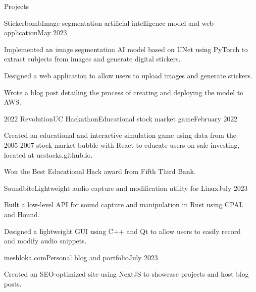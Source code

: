\documentclass{article}
\newlength{\tabin}
\newlength{\secsep}
\newenvironment{tabbedsection}[1]{
  \begin{list}{}{
      \setlength{\itemsep}{0pt}
      \setlength{\labelsep}{0pt}
      \setlength{\labelwidth}{0pt}
      \setlength{\leftmargin}{\tabin}
      \setlength{\rightmargin}{\tabin}
      \setlength{\listparindent}{0pt}
      \setlength{\parsep}{0pt}
      \setlength{\parskip}{0pt}
      \setlength{\partopsep}{0pt}
      \setlength{\topsep}{#1}
    }
  \item[]
}{\end{list}}
\newenvironment{resume_section}[1]{
  \filbreak
  \vspace{2\secsep}
  {\color {MyDarkBlue}\textbf{\large #1}} \hrulefill
  \begin{tabbedsection}{\secsep}
}{\end{tabbedsection}}
\newenvironment{subitems}{
  \renewcommand{\labelitemi}{-}
  \begin{itemize}
      \setlength{\labelsep}{1em}
}{\end{itemize}}
\newenvironment{resume_employer}[4]{
  \vspace{\secsep}
  \textbf{#1} \\ 
  \indent {\small #2} \hfill {\footnotesize#3 (#4)}
  \begin{tabbedsection}{0pt}
  \begin{subitems}
}{\end{subitems}\end{tabbedsection}}
\begin{document}
\begin{resume_section}{Projects}
  \begin{resume_employer}{Stickerbomb}{Image segmentation artificial intelligence model and web application}{}{May 2023}
    \item Implemented an image segmentation AI model based on UNet using PyTorch to extract subjects from images and generate digital stickers.
    \item Designed a web application to allow users to upload images and generate stickers.
    \item Wrote a blog post detailing the process of creating and deploying the model to AWS.
  \end{resume_employer}

  \begin{resume_employer}{2022 RevolutionUC Hackathon}{Educational stock market game}{}{February 2022}
    \item Created an educational and interactive simulation game using data from the 2005-2007 stock market bubble with React to educate users on safe investing, located at ucstocks.github.io.
    \item Won the Best Educational Hack award from Fifth Third Bank.
  \end{resume_employer}

  \begin{resume_employer}{Soundbite}{Lightweight audio capture and modification utility for Linux}{}{July 2023}
    \item Built a low-level API for sound capture and manipulation in Rust using CPAL and Hound.
    \item Designed a lightweight GUI using C++ and Qt to allow users to easily record and modify audio snippets.
  \end{resume_employer}

  \begin{resume_employer}{ineshloka.com}{Personal blog and portfolio}{}{July 2023}
    \item Created an SEO-optimized site using NextJS to showcase projects and host blog posts.
  \end{resume_employer}
\end{resume_section}
\end{document}
